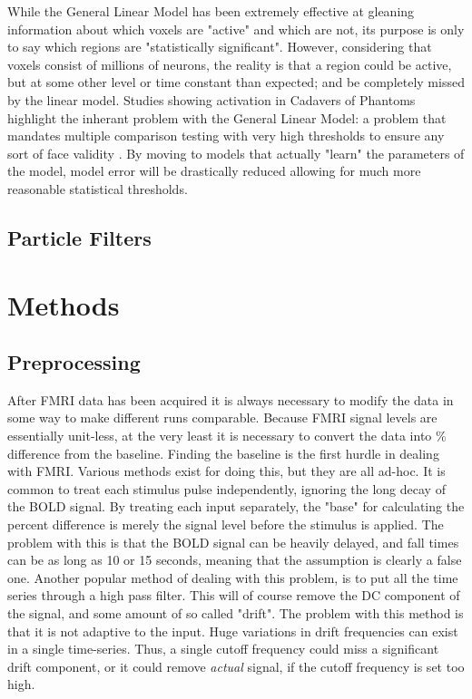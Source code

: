 \documentclass{article}
\begin{document}
While the General Linear Model has been extremely effective at
gleaning information about which voxels are "active" and which
are not, its purpose is only to say which regions are "statistically
significant". However, considering that voxels consist of millions
of neurons, the reality is that a
region could be active, but at some other level or time constant
than expected; and be completely missed by the linear model. 
Studies showing activation
in Cadavers of Phantoms highlight the inherant problem with the 
General Linear Model: a problem that mandates multiple
comparison testing with very high thresholds to ensure any 
sort of face validity \citep{drift}.
By moving to models that actually "learn" the 
parameters of the model, model error will be drastically
reduced allowing for much more reasonable statistical thresholds.
\subsection{Particle Filters}

\section*{Methods}
\subsection*{Preprocessing}
After FMRI data has been acquired it is always necessary to modify the
data in some way to make different runs comparable. Because FMRI signal
levels are essentially unit-less, at the very least it is necessary to convert
the data into \% difference from the baseline. Finding the baseline is the
first hurdle in dealing with FMRI. Various methods exist for doing this,
but they are all ad-hoc. It is common to treat each stimulus pulse independently,
ignoring the long decay of the BOLD signal. By treating each input separately,
the "base" for calculating the percent difference is merely the signal level 
before the stimulus is applied. The problem with this is that the BOLD signal
can be heavily delayed, and fall times can be as long as 10 or 15 seconds,
meaning that the assumption is clearly a false one. Another popular method 
of dealing with this problem, is to put all the time series through a high
pass filter. This will of course remove the DC component of the signal, and 
some amount of so called "drift". The problem with this method is that it is
not adaptive to the input. Huge variations in drift frequencies can exist 
in a single time-series. Thus, a single cutoff frequency could miss a significant
drift component, or it could remove \emph{actual} signal, if the cutoff frequency is
set too high. 
\end{document}
